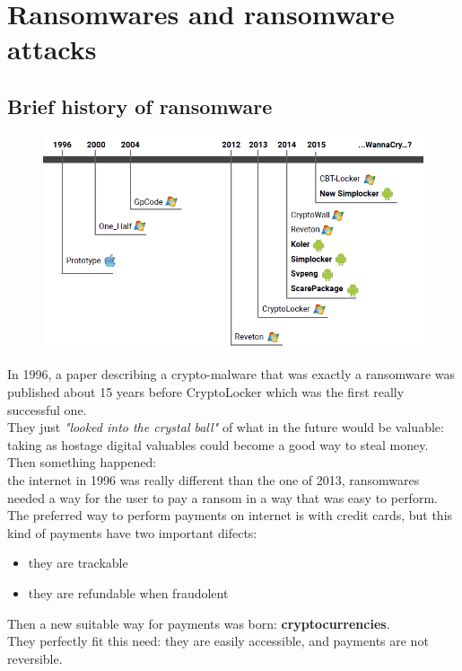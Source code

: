     \section{Ransomwares and ransomware attacks}
        \subsection{Brief history of ransomware}
            \begin{figure}[ht!]
                \centering
                \includegraphics[width=0.40\linewidth]{ransomware_history.png}
            \end{figure}
            In 1996, a paper describing a crypto-malware that was exactly a ransomware was published about 15 years before CryptoLocker which was the first really successful one.\\
            They just \textit{"looked into the crystal ball"} of what in the future would be valuable: taking as hostage digital valuables could become a good way to steal money.\\
            Then something happened:\\
            the internet in 1996 was really different than the one of 2013, ransomwares needed a way for the user to pay a ransom in a way that was easy to perform.
            The preferred way to perform payments on internet is with credit cards, but this kind of payments have two important difects:
            \begin{itemize}
                \item they are trackable
                \item they are refundable when fraudolent
            \end{itemize}
            Then a new suitable way for payments was born: \textbf{cryptocurrencies}.\\
            They perfectly fit this need: they are easily accessible, and payments are not reversible.
